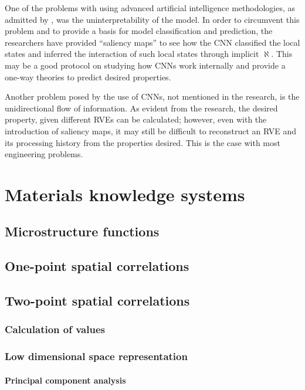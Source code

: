 One of the problems with using advanced artificial intelligence methodologies, as admitted by , was the uninterpretability of the model.
In order to circumvent this problem and to provide a basis for model classification and prediction, the researchers have provided ``saliency maps'' to see how the CNN classified the local states and inferred the interaction of such local states through implicit $\aleph$.
This may be a good protocol on studying how CNNs work internally and provide a one-way theories to predict desired properties.

Another problem posed by the use of CNNs, not mentioned in the research, is the unidirectional flow of information.
As evident from the research, the desired property, given different RVEs can be calculated; however, even with the introduction of saliency maps, it may still be difficult to reconstruct an RVE and its processing history from the properties desired.
This is the case with most engineering problems.


\section{Materials knowledge systems}

\subsection{Microstructure functions}
\subsection{One-point spatial correlations}
\subsection{Two-point spatial correlations}
\subsubsection{Calculation of values}
\subsubsection{Low dimensional space representation}
\paragraph{Principal component analysis}
